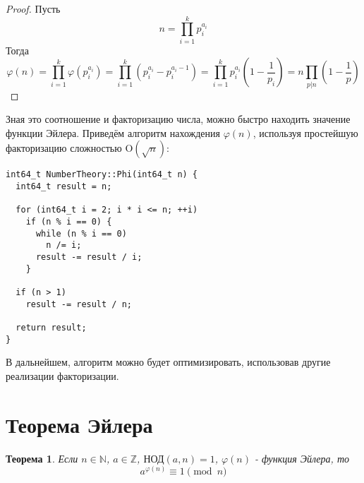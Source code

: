 \documentclass[12pt, a4paper, openany]{book}
\newtheorem*{theorem}{Теорема}
\begin{document}
\begin{proof}
    Пусть \[
    n = \prod_{i = 1}^k p_{i}^{a_{i}}
    \]
    Тогда \[
    \varphi(n) = \prod_{i = 1}^k \varphi(p_{i}^{a_{i}}) = 
    \prod_{i = 1}^k (p_{i}^{a_{i}} - p_{i}^{a_{i} - 1}) =
    \prod_{i = 1}^k p_{i}^{a_{i}} \left(1 - \frac{1}{p_{i}}\right) = 
    n \prod_{p|n} \left(1 - \frac{1}{p}\right)
    \]
\end{proof}

    Зная это соотношение и факторизацию числа, можно быстро находить значение функции Эйлера. Приведём алгоритм нахождения $\varphi(n)$, используя простейшую факторизацию сложностью $\text{O}(\sqrt{n})$: 
    
\begin{lstlisting}[breaklines=true]
int64_t NumberTheory::Phi(int64_t n) {
  int64_t result = n;

  for (int64_t i = 2; i * i <= n; ++i)
    if (n % i == 0) {
      while (n % i == 0)
        n /= i;
      result -= result / i;
    }

  if (n > 1)
    result -= result / n;

  return result;
}
\end{lstlisting}

    В дальнейшем, алгоритм можно будет оптимизировать, использовав другие реализации факторизации.

\newpage
\section{Теорема Эйлера}
\begin{theorem}
    Если $n \in \mathbb{N}$, $a \in \mathbb{Z}$, $\text{НОД}(a, n) = 1$, $\varphi(n)$ - функция Эйлера, то
    \[
    a^{\varphi(n)} \equiv 1 \pmod{n}
    \]
\end{theorem}
\end{document}
